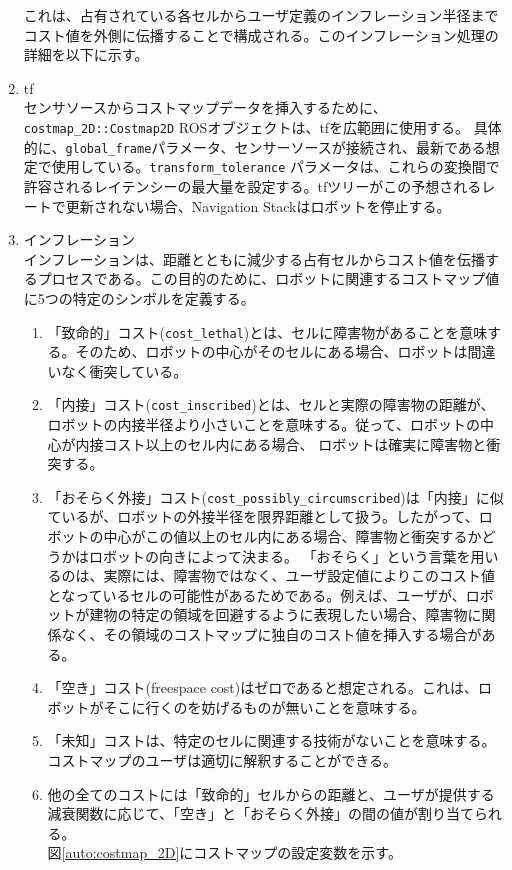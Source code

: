 \begin{enumerate}
  これは、占有されている各セルからユーザ定義のインフレーション半径までコスト値を外側に伝播することで構成される。このインフレーション処理の詳細を以下に示す。
  \item tf\\
  センサソースからコストマップデータを挿入するために、\verb|costmap_2D::Costmap2D| ROSオブジェクトは、tfを広範囲に使用する。
  具体的に、\verb|global_frame|パラメータ、センサーソースが接続され、最新である想定で使用している。\verb|transform_tolerance|
  パラメータは、これらの変換間で許容されるレイテンシーの最大量を設定する。tfツリーがこの予想されるレートで更新されない場合、Navigation Stackはロボットを停止する。
  \item インフレーション\\
  インフレーションは、距離とともに減少する占有セルからコスト値を伝播するプロセスである。この目的のために、ロボットに関連するコストマップ値に5つの特定のシンボルを定義する。
  \begin{enumerate}
    \item 「致命的」コスト(\verb|cost_lethal|)とは、セルに障害物があることを意味する。そのため、ロボットの中心がそのセルにある場合、ロボットは間違いなく衝突している。
    \item 「内接」コスト(\verb|cost_inscribed|)とは、セルと実際の障害物の距離が、ロボットの内接半径より小さいことを意味する。従って、ロボットの中心が内接コスト以上のセル内にある場合、
    ロボットは確実に障害物と衝突する。
    \item 「おそらく外接」コスト(\verb|cost_possibly_circumscribed|)は「内接」に似ているが、ロボットの外接半径を限界距離として扱う。したがって、ロボットの中心がこの値以上のセル内にある場合、障害物と衝突するかどうかはロボットの向きによって決まる。
    「おそらく」という言葉を用いるのは、実際には、障害物ではなく、ユーザ設定値によりこのコスト値となっているセルの可能性があるためである。例えば、ユーザが、ロボットが建物の特定の領域を回避するように表現したい場合、障害物に関係なく、その領域のコストマップに独自のコスト値を挿入する場合がある。
    \item 「空き」コスト(freespace cost)はゼロであると想定される。これは、ロボットがそこに行くのを妨げるものが無いことを意味する。
    \item 「未知」コストは、特定のセルに関連する技術がないことを意味する。コストマップのユーザは適切に解釈することができる。
    \item 他の全てのコストには「致命的」セルからの距離と、ユーザが提供する減衰関数に応じて、「空き」と「おそらく外接」の間の値が割り当てられる。
    \\図\ref{auto:costmap_2D}にコストマップの設定変数を示す。

\end{enumerate}
\end{enumerate}
